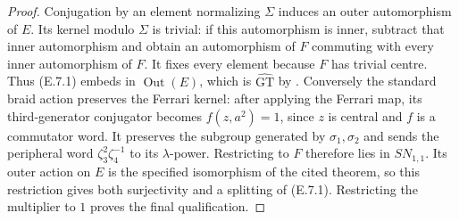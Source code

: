 \begin{proof}
Conjugation by an element normalizing $\Sigma$ induces an outer
automorphism of $E$.  Its kernel modulo $\Sigma$ is trivial: if this
automorphism is inner, subtract that inner automorphism and obtain an
automorphism of $F$ commuting with every inner automorphism of $F$.
It fixes every element because $F$ has trivial centre.  Thus (E.7.1)
embeds in $\operatorname{Out}(E)$, which is
$\widehat{\mathrm{GT}}$ by
\citet[Theorem~B = Theorem~4.3 and Corollary~C]{MinamideNakamura2022}.
Conversely the standard braid action preserves the Ferrari kernel:
after applying the Ferrari map, its third-generator conjugator becomes
$f(z,a^2)=1$, since $z$ is central and $f$ is a commutator word.
It preserves the subgroup generated by $\sigma_1,\sigma_2$ and sends
the peripheral word $\zeta_3^2\zeta_4^{-1}$ to its $\lambda$-power.
Restricting to $F$ therefore lies in $SN_{1,1}$.  Its outer action on
$E$ is the specified isomorphism of the cited theorem, so this
restriction gives both surjectivity and a splitting of (E.7.1).
Restricting the multiplier to $1$ proves the final qualification.
\end{proof}

